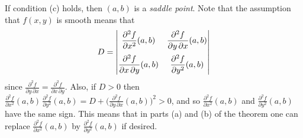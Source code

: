 If condition (c) holds, then $(a,b)$ is a \emph{saddle point}.
Note that the assumption that $f(x,y)$ is smooth means that
\begin{displaymath}
 D =
 \begin{vmatrix}
  \dfrac{\partial^2 f}{\partial x^2}(a,b) & \dfrac{\partial^2 f}{\partial y \, \partial x}(a,b)\vspace{2mm}\\
  \dfrac{\partial^2 f}{\partial x \, \partial y}(a,b) & \dfrac{\partial^2 f}{\partial y^2}(a,b)
 \end{vmatrix}
\end{displaymath}
since $\frac{\partial^2 f}{\partial y \, \partial x} = \frac{\partial^2 f}{\partial x \, \partial y}$. Also, if $D > 0$
then $\frac{\partial^2 f}{\partial x^2}(a,b) \, \frac{\partial^2 f}{\partial y^2}(a,b) = D +
\biggl( \frac{\partial^2 f}{\partial y \, \partial x}(a,b) \biggr)^2 > 0$, and so
$\frac{\partial^2 f}{\partial x^2}(a,b)$ and $\frac{\partial^2 f}{\partial y^2}(a,b)$ have the same sign. This means
that in parts (a) and (b) of the theorem one can replace $\frac{\partial^2 f}{\partial x^2}(a,b)$ by
$\frac{\partial^2 f}{\partial y^2}(a,b)$ if desired.

